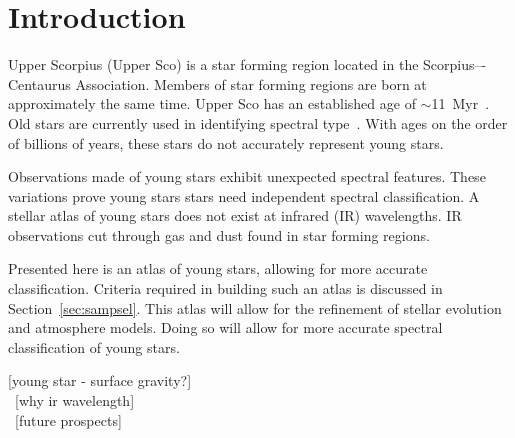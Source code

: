 \section{Introduction}
  



  
  
Upper Scorpius (Upper Sco) is a star forming region located in 
the Scorpius–-Centaurus Association.  Members of star forming regions 
are born at approximately the same time.  Upper Sco has an established age 
of $\sim$11~Myr~\cite{Pecaut_2012}.  Old stars are currently used in 
identifying spectral type~\cite{Rayner_2009, Ivanov_2004}.  With ages on 
the order of billions of years, these stars do not accurately represent 
young stars.



Observations made of young stars exhibit unexpected 
spectral features.  These variations prove young stars 
stars need independent spectral classification.  A stellar 
atlas of young stars does not exist at infrared (IR) 
wavelengths.  IR observations cut through gas and dust found 
in star forming regions.



Presented here is an atlas of young stars, allowing for 
more accurate classification.  Criteria required in building such 
an atlas is discussed in Section~\ref{sec:sampsel}.  
This atlas will allow for the refinement of stellar evolution and 
atmosphere models.  Doing so will allow for more accurate spectral 
classification of young stars.


[young star - surface gravity?]\\
~[why ir wavelength]\\
~[future prospects]